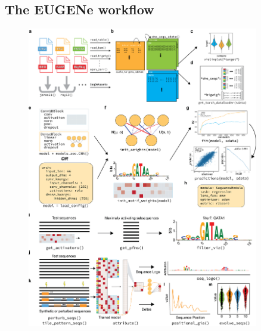 \subsection{The EUGENe workflow}

\begin{figure}[p]
    \centering
    \includegraphics[width=0.9\textwidth, height=0.745\textheight]{1_figures-and-files/extended_data_figure3.png}

\end{figure}
